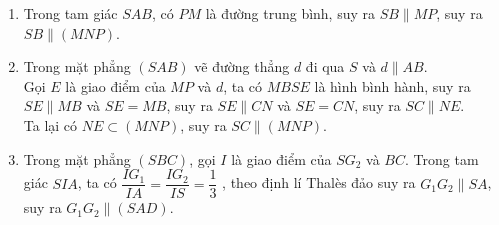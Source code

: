 \begin{ex}
{\begin{enumerate}
			\item Trong  tam giác $SAB$, có $PM$ là đường trung bình, suy ra $SB\parallel MP$, suy ra $S B\parallel (M N P)$.
			\item Trong mặt phẳng $(SAB)$ vẽ đường thẳng $d$ đi qua $S$ và $d\parallel  AB$.\\
			Gọi $E$ là giao điểm của $MP$ và $d$, ta có $MBSE$ là hình bình hành, suy ra $S E\parallel M B$ và $S E=M B$, suy ra $SE\parallel CN$ và $SE=CN$, suy ra $SC\parallel NE$.\\ 
			 Ta lại có $NE\subset(MNP)$, suy ra $SC\parallel (MNP)$.
			\item Trong mặt phẳng $(SBC)$, gọi $I$ là giao  điểm của $SG_2$ và $BC$.
			Trong tam giác $SIA$, ta có $\dfrac{IG_1}{I A}=\dfrac{IG_2}{IS}=\dfrac{1}{3}$ , theo định lí Thalès đảo suy  ra $G_1G_2\parallel SA$, suy ra $G_1G_2\parallel (SAD)$.
		\end{enumerate}
	 }
\end{ex}

